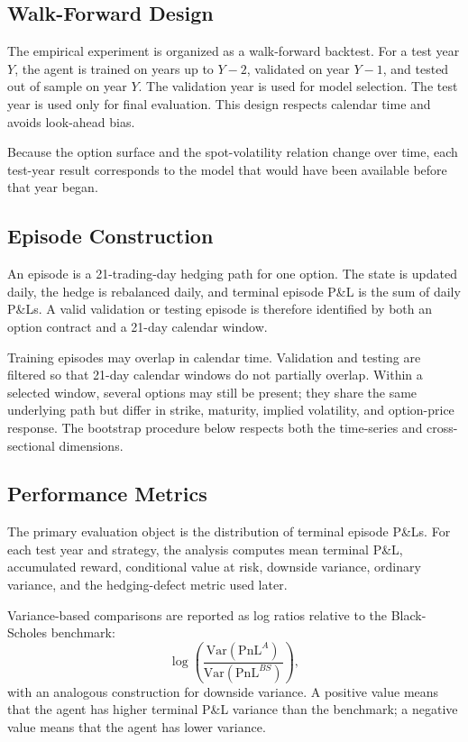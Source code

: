 \documentclass[a4paper,12pt]{article}
\numberwithin{equation}{section}
\begin{document}
\subsection{Walk-Forward Design}

The empirical experiment is organized as a walk-forward backtest. For a test year $Y$, the agent is trained on years up to $Y-2$, validated on year $Y-1$, and tested out of sample on year $Y$. The validation year is used for model selection. The test year is used only for final evaluation. This design respects calendar time and avoids look-ahead bias.

Because the option surface and the spot-volatility relation change over time, each test-year result corresponds to the model that would have been available before that year began.

\subsection{Episode Construction}

An episode is a 21-trading-day hedging path for one option. The state is updated daily, the hedge is rebalanced daily, and terminal episode P\&L is the sum of daily P\&Ls. A valid validation or testing episode is therefore identified by both an option contract and a 21-day calendar window.

Training episodes may overlap in calendar time. Validation and testing are filtered so that 21-day calendar windows do not partially overlap. Within a selected window, several options may still be present; they share the same underlying path but differ in strike, maturity, implied volatility, and option-price response. The bootstrap procedure below respects both the time-series and cross-sectional dimensions.

\subsection{Performance Metrics}

The primary evaluation object is the distribution of terminal episode P\&Ls. For each test year and strategy, the analysis computes mean terminal P\&L, accumulated reward, conditional value at risk, downside variance, ordinary variance, and the hedging-defect metric used later.

Variance-based comparisons are reported as log ratios relative to the Black-Scholes benchmark:
\begin{equation}
    \log
    \left(
        \frac{
            \mathrm{Var}(\mathrm{PnL}^{A})
        }{
            \mathrm{Var}(\mathrm{PnL}^{BS})
        }
    \right),
    \label{eq:var_ratio}
\end{equation}
with an analogous construction for downside variance. A positive value means that the agent has higher terminal P\&L variance than the benchmark; a negative value means that the agent has lower variance.
\end{document}
